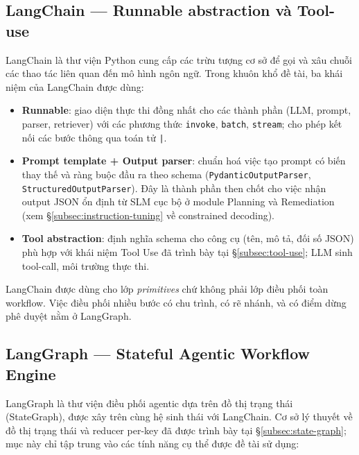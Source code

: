 \subsection{LangChain --- Runnable abstraction và Tool-use}
\label{subsec:langchain-tool}

LangChain \cite{langchain_docs} là thư viện Python cung cấp các trừu tượng cơ sở để gọi và xâu chuỗi các thao tác liên quan đến mô hình ngôn ngữ. Trong khuôn khổ đề tài, ba khái niệm của LangChain được dùng:
\begin{itemize}
  \item \textbf{Runnable}: giao diện thực thi đồng nhất cho các thành phần (LLM, prompt, parser, retriever) với các phương thức \texttt{invoke}, \texttt{batch}, \texttt{stream}; cho phép kết nối các bước thông qua toán tử \texttt{|}.
  \item \textbf{Prompt template + Output parser}: chuẩn hoá việc tạo prompt có biến thay thế và ràng buộc đầu ra theo schema (\texttt{PydanticOutputParser}, \texttt{StructuredOutputParser}). Đây là thành phần then chốt cho việc nhận output JSON ổn định từ SLM cục bộ ở module Planning và Remediation (xem §\ref{subsec:instruction-tuning} về constrained decoding).
  \item \textbf{Tool abstraction}: định nghĩa schema cho công cụ (tên, mô tả, đối số JSON) phù hợp với khái niệm Tool Use đã trình bày tại §\ref{subsec:tool-use}; LLM sinh tool-call, môi trường thực thi.
\end{itemize}

LangChain được dùng cho lớp \textit{primitives} chứ không phải lớp điều phối toàn workflow. Việc điều phối nhiều bước có chu trình, có rẽ nhánh, và có điểm dừng phê duyệt nằm ở LangGraph.

\subsection{LangGraph --- Stateful Agentic Workflow Engine}
\label{subsec:langgraph-tool}

LangGraph \cite{langgraph2024} là thư viện điều phối agentic dựa trên đồ thị trạng thái (StateGraph), được xây trên cùng hệ sinh thái với LangChain. Cơ sở lý thuyết về đồ thị trạng thái và reducer per-key đã được trình bày tại §\ref{subsec:state-graph}; mục này chỉ tập trung vào các tính năng cụ thể được đề tài sử dụng:

